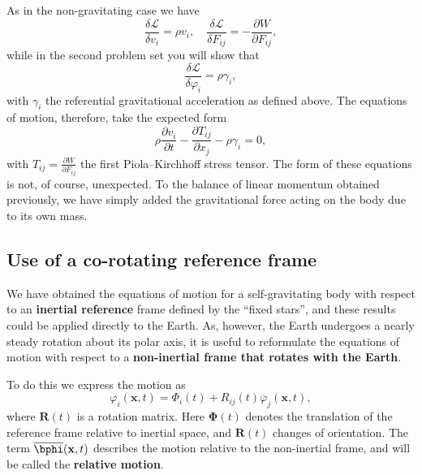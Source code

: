 As in the non-gravitating case we have
\begin{equation}
\frac{\delta\mathcal{L}}{\delta v_{i}}=\rho v_{i},\quad \frac{\delta\mathcal{L}}{\delta F_{ij}}=-\frac{\partial W}{\partial F_{ij}},
\label{eq:26}
\end{equation}
while in the second problem set you will show that
\begin{equation}
\frac{\delta\mathcal{L}}{\delta\varphi_{i}}=\rho\gamma_{i},
\label{eq:27}
\end{equation}
with $\gamma_{i}$ the referential gravitational acceleration as defined above. The equations of motion, therefore, take the expected form
\begin{equation}
\rho\frac{\partial v_{i}}{\partial t}-\frac{\partial T_{ij}}{\partial x_{j}}-\rho\gamma_{i}=0,
\label{eq:28}
\end{equation}
with $T_{ij}=\frac{\partial W}{\partial F_{ij}}$ the first Piola--Kirchhoff stress tensor. The form 
of these equations is not, of course, unexpected. To the balance of linear momentum obtained previously, 
we have simply added the gravitational force acting on the body due to its own mass.

\subsection*{Use of a co-rotating reference frame}
We have obtained the equations of motion for a self-gravitating body with respect to an \textbf{inertial reference} 
frame defined by the ``fixed stars'', and these results could be applied directly to the Earth. As, however, 
the Earth undergoes a nearly steady rotation about its polar axis, it is useful to reformulate the equations 
of motion with respect to a \textbf{non-inertial frame that rotates with the Earth}.

To do this we express the motion as
\begin{equation}
\varphi_{i}(\mathbf{x},t)=\Phi_{i}(t)+R_{ij}(t)\overline{\varphi}_{j}(\mathbf{x},t),
\label{eq:29}
\end{equation}
where $\mathbf{R}(t)$ is a rotation matrix. Here $\bm{\Phi}(t)$ denotes the translation of the reference frame relative 
to inertial space, and $\mathbf{R}(t)$ changes of orientation. The term $\overline{\bphi}(\mathbf{x},t)$ 
 describes the motion relative to the non-inertial frame, and will be called the \textbf{relative motion}.
 
